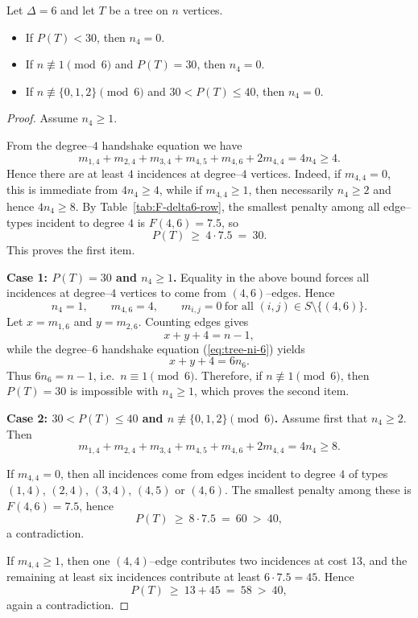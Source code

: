 \documentclass[preprint,12pt]{elsarticle}
\begin{document}
\begin{lemma}
\label{lem:no4-threshold}
Let $\Delta=6$ and let $T$ be a tree on $n$ vertices.

\begin{itemize}
\item If $P(T)<30$, then $n_4=0$.
\item If $n\not\equiv 1 \pmod 6$ and $P(T)=30$, then $n_4=0$.
\item If $n\not\equiv \{0,1,2\} \pmod 6$ and $30<P(T)\le 40$, then $n_4=0$.
\end{itemize}
\end{lemma}

\begin{proof}
Assume $n_4\ge 1$.

From the degree--$4$ handshake equation we have
\[
m_{1,4}+m_{2,4}+m_{3,4}+m_{4,5}+m_{4,6}+2m_{4,4}=4n_4 \ge 4 .
\]
Hence there are at least $4$ incidences at degree--$4$ vertices. 
Indeed, if $m_{4,4}=0$, this is immediate from $4n_4\ge 4$, while if
$m_{4,4}\ge 1$, then necessarily $n_4\ge 2$ and hence $4n_4\ge 8$.
By Table~\ref{tab:F-delta6-row}, the smallest penalty among all edge--types
incident to degree $4$ is $F(4,6)=7.5$, so
\[
P(T)\ \ge\ 4\cdot 7.5 \ =\ 30 .
\]
This proves the first item.

\medskip
\noindent
\textbf{Case 1: $P(T)=30$ and $n_4\ge 1$.}  
Equality in the above bound forces all incidences at degree--$4$ vertices
to come from $(4,6)$--edges. Hence
\[
n_4=1, \qquad m_{4,6}=4, \qquad m_{i,j}=0 \ \text{for all }(i,j)\in S\setminus\{(4,6)\}.
\]
Let $x=m_{1,6}$ and $y=m_{2,6}$.  
Counting edges gives
\[
x+y+4=n-1 ,
\]
while the degree--$6$ handshake equation (\ref{eq:tree-ni-6}) yields
\[
x+y+4=6n_6 .
\]
Thus $6n_6=n-1$, i.e.\ $n\equiv 1\pmod 6$.  
Therefore, if $n\not\equiv 1\pmod 6$, then $P(T)=30$ is impossible with $n_4\ge 1$,
which proves the second item.

\medskip
\noindent
\textbf{Case 2: $30<P(T)\le 40$ and $n\not\equiv\{0,1,2\}\pmod 6$.}  
Assume first that $n_4\ge 2$. Then
\[
m_{1,4}+m_{2,4}+m_{3,4}+m_{4,5}+m_{4,6}+2m_{4,4}=4n_4 \ge 8 .
\]

If $m_{4,4}=0$, then all incidences come from edges incident to degree $4$
of types $(1,4)$, $(2,4)$, $(3,4)$, $(4,5)$ or $(4,6)$.  
The smallest penalty among these is $F(4,6)=7.5$, hence
\[
P(T)\ \ge\ 8\cdot 7.5 \ =\ 60 \ >\ 40 ,
\]
a contradiction.

If $m_{4,4}\ge 1$, then one $(4,4)$--edge contributes two incidences at cost $13$,
and the remaining at least six incidences contribute at least $6\cdot 7.5=45$.
Hence
\[
P(T)\ \ge\ 13 + 45 \ =\ 58 \ >\ 40 ,
\]
again a contradiction.


\end{proof}
\end{document}

